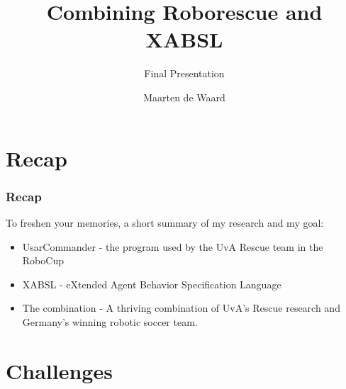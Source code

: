 \documentclass{beamer}
\title{Combining Roborescue and XABSL}
\subtitle{Final Presentation}
\author{Maarten de Waard}
\institute{UvA}
\newcommand{\slide}[2]
{
\begin{frame}
\frametitle{#1} 

#2

\end{frame}
}
\begin{document}
{
\begin{frame}
\titlepage
\end{frame}
}

\begin{frame}
\tableofcontents
\end{frame}

\section{Recap}
\slide{Recap}
{
    To freshen your memories, a short summary of my research and my goal:
    \begin{itemize}
        \item UsarCommander - the program used by the UvA Rescue team in the
        RoboCup
        \item XABSL - eXtended Agent Behavior Specification Language
        \item The combination - A thriving combination of UvA's Rescue research and Germany's winning robotic soccer team.
    \end{itemize}
}

\section{Challenges}
\end{document}
